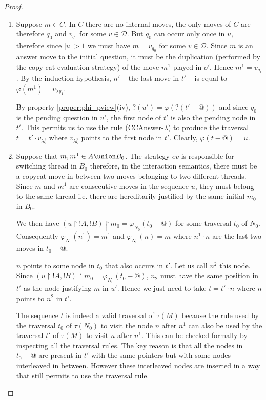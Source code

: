 \begin{proof}
\begin{itemize}
    \begin{enumerate}
    \item Suppose $m \in C$. In $C$ there are no internal moves, the only moves of $C$ are therefore $q_0$ and
    $v_{q_0}$ for some $v\in\mathcal{D}$. But $q_0$ can occur only once in $u$, therefore since $|u|>1$ we must have $m = v_{q_0}$
    for some $v\in \mathcal{D}$.  Since $m$ is an answer move to the initial question, it must be
    the duplication  (performed by the copy-cat evaluation strategy) of the move $m^1$ played in $o'$.
    Hence $m^1=v_{q_1}$. By the induction hypothesis, $n'$ -- the last move in $t'$ -- is equal to
    $\varphi(m^1) = v_{\lambda y_1}$.

    By property \ref{proper:phi_pview}(iv), $?(u') = \varphi(?(t'-@))$ and
    since $q_0$ is the pending question in $u'$, the first node of $t'$ is also the pending node in $t'$.
    This permits us to use the rule (CCAnswer-$\lambda$) to produce the traversal $t = t' \cdot v_{\lambda \overline{\xi}}$
    where $v_{\lambda \overline{\xi}}$ points to the first node in $t'$. Clearly, $\varphi(t-@) = u$.



    \item Suppose that $m,m^1 \in A \union B_0$.
    The strategy $ev$ is responsible for switching thread in $B_0$ therefore, in the interaction semantics,
    there must be a copycat move in-between two moves belonging to two different threads.
    Since $m$ and $m^1$ are consecutive moves in the sequence $u$, they must belong to the same thread i.e. there are
    hereditarily justified  by the same initial $m_0$ in $B_0$.


    We then have $(u \upharpoonright !A, !B)\upharpoonright m_0 = \varphi_{N_0}(t_0-@)$ for some traversal $t_0$ of $N_0$.
    Consequently  $\varphi_{N_0}(n^1) = m^1$ and $\varphi_{N_0}(n) = m$
    where $n^1 \cdot n$ are the last two moves in $t_0-@$.

    $n$ points to some node in $t_0$ that also occurs in $t'$. Let us call $n^2$ this node.
    Since $(u \upharpoonright !A, !B)\upharpoonright m_0 = \varphi_{N_0}(t_0-@)$,
    $n_2$ must have the same position in $t'$ as the node justifying $m$ in $u'$.
    Hence we just need to take $t = t' \cdot n$ where $n$ points to $n^2$ in $t'$.

    The sequence $t$ is indeed a valid traversal of $\tau(M)$
    because the rule used by the traversal $t_0$
    of $\tau(N_0)$ to visit the node $n$ after $n^1$ can also be used by the traversal $t'$ of $\tau(M)$
    to visit $n$ after $n^1$.
    This can be checked formally by inspecting all the traversal rules. The key reason is that
    all the nodes in $t_0-@$ are present in $t'$ with the same pointers but with some nodes interleaved in between.
    However these interleaved nodes are inserted in a way that still permits to use the traversal rule.


\end{enumerate}
\end{itemize}
\end{proof}
